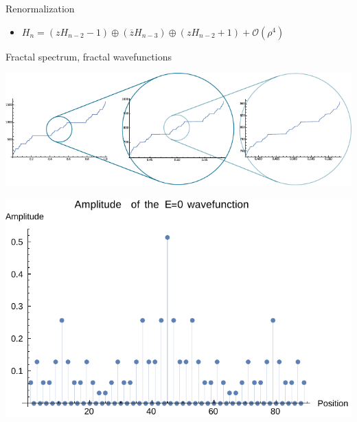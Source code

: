 \documentclass[xcolor=x11names,compress,professionalfonts]{beamer}
\renewcommand{\(}{\begin{columns}}
\renewcommand{\)}{\end{columns}}
\newcommand{\<}[1]{\begin{column}{#1}}
\renewcommand{\>}{\end{column}}
\newcommand{\zb}{\ensuremath{\overline{z}}}
\begin{document}
\begin{frame}{Renormalization}
\begin{itemize}
		
		\item $ H_n = \left( z H_{n-2} - 1 \right) \oplus \left( \zb H_{n-3} \right) \oplus \left( z H_{n-2} + 1 \right) + \mathcal{O}(\rho^4) $
	\end{itemize}
    
\end{frame}

\begin{frame}{Fractal spectrum, fractal wavefunctions}
    {\centering
    	\includegraphics[scale=.9]{idos.pdf}
    	
     }
     
     {\centering
    	\includegraphics[scale=.5]{amplitude_wf.pdf}
    	
     }
\end{frame}
\end{document}
